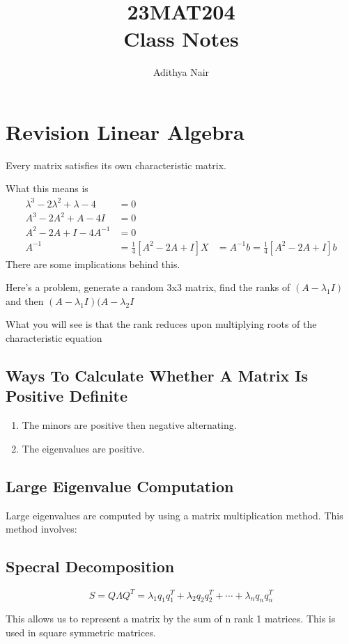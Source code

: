 \documentclass[twoside]{report}
\title{\Huge{23MAT204}\\ Class Notes}
\author{\huge{Adithya Nair}}
\date{}
\begin{document}
\maketitle
\chapter{Revision Linear Algebra}
\begin{theorem}
	Every matrix satisfies its own characteristic matrix.
\end{theorem}
What this means is
\begin{align*}
	\lambda^3 - 2\lambda^2 + \lambda -4 &= 0 \\	
	A^3 - 2A^2 + A -4I &= 0 \\	
	A^2 - 2A + I - 4A^{-1} &= 0 \\
	A^{-1} &= \frac{1}{4}[A^2 - 2A + I]
	X &= A^{-1}b = \frac{1}{4}[A^2 - 2A + I]b
\end{align*}
There are some implications behind this.

Here's a problem,
generate a random 3x3 matrix, find the ranks of $(A- \lambda_1 I)$ and then $(A-\lambda_1 I)(A-\lambda_2 I$

What you will see is that the rank reduces upon multiplying roots of the characteristic equation

\section{Ways To Calculate Whether A Matrix Is Positive Definite}
\begin{enumerate}
	\item The minors are positive then negative alternating.
	\item The eigenvalues are positive.
\end{enumerate}
\section{Large Eigenvalue Computation}
Large eigenvalues are computed by using a matrix multiplication method. This method involves:

\section{Specral Decomposition}
\[
	S = Q \Lambda Q^T = \lambda_1 q_1 q_1^T + \lambda_2 q_2 q_2^T + \cdots + \lambda_n q_n q_n^T
\]

This allows us to represent a matrix by the sum of n rank 1 matrices. This is used in square symmetric matrices.
\end{document}
